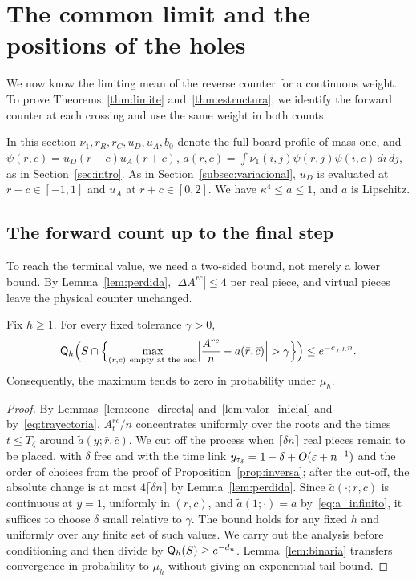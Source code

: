 \section{The common limit and the positions of the holes}\label{sec:limite}

We now know the limiting mean of the reverse counter for a continuous weight. To prove
Theorems~\ref{thm:limite}
and~\ref{thm:estructura}, we identify the forward counter at each crossing and use the same weight in both
counts.

In this section $\nu_1,r_R,r_C,u_D,u_A,b_0$ denote the full-board profile of mass one, and
$\psi(r,c)=u_D(r-c)u_A(r+c)$,
$a(r,c)=\int\nu_1(i,j)\psi(r,j)\psi(i,c)\,di\,dj$, as in Section~\ref{sec:intro}. As in
Section~\ref{subsec:variacional}, $u_D$ is
evaluated at $r-c\in[-1,1]$ and $u_A$ at $r+c\in[0,2]$. We have $\kappa^4\le a\le1$, and $a$ is Lipschitz.

\subsection{The forward count up to the final step}

To reach the terminal value, we need a two-sided bound, not merely a lower bound. By
Lemma~\ref{lem:perdida},
$|\Delta A^{rc}|\le4$ per real piece, and virtual pieces leave the physical counter unchanged.

\begin{proposicion}\label{prop:directa} Fix $h\ge1$. For every fixed tolerance $\gamma>0$, \[
 \QQ_h\Bigl(S\cap\Bigl\{\max_{(r,c)\ \text{empty at the end}}
 \Bigl|\frac{A^{rc}}n-a(\bar r,\bar c)\Bigr|>\gamma\Bigr\}\Bigr)\le e^{-c_{\gamma,h}n}.
\] Consequently, the maximum tends to zero in probability under $\mu_h$. \end{proposicion}

\begin{proof} By Lemmas~\ref{lem:conc_directa} and~\ref{lem:valor_inicial} and by~\eqref{eq:trayectoria},
$A^{rc}_t/n$ concentrates
uniformly over the roots and the times $t\le T_\zeta$ around $\tilde a(y;\bar r,\bar c)$. We cut off the
process when $\lceil\delta
n\rceil$ real pieces remain to be placed, with $\delta$ free and with the time link
$y_{\tau_\delta}=1-\delta+O(\varepsilon+n^{-1})$ and the
order of choices from the proof of Proposition~\ref{prop:inversa}; after the cut-off, the absolute change is
at most
$4\lceil\delta n\rceil$ by Lemma~\ref{lem:perdida}. Since $\tilde a(\cdot;r,c)$ is continuous at $y=1$,
uniformly in $(r,c)$, and
$\tilde a(1;\cdot)=a$ by~\eqref{eq:a_infinito}, it suffices to choose $\delta$ small relative to $\gamma$.
The bound holds for any
fixed $h$ and uniformly over any finite set of such values. We carry out the analysis before conditioning
and then divide by
$\mathsf{Q}_h(S)\ge e^{-d_n}$. Lemma~\ref{lem:binaria} transfers convergence in probability to $\mu_h$ without
giving an exponential tail
bound. \end{proof}

